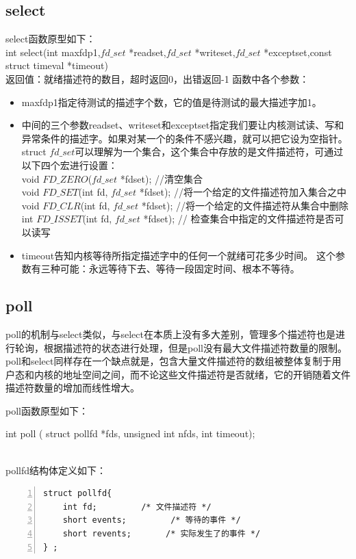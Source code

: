 \subsection{select}
select函数原型如下：\\
int select(int maxfdp1,$fd\_set$ *readset,$fd\_set$ *writeset,$fd\_set$ *exceptset,const struct timeval *timeout) \\
返回值：就绪描述符的数目，超时返回0，出错返回-1
函数中各个参数：
\begin{itemize}
\item maxfdp1指定待测试的描述字个数，它的值是待测试的最大描述字加1。
\item 中间的三个参数readset、writeset和exceptset指定我们要让内核测试读、写和异常条件的描述字。如果对某一个的条件不感兴趣，就可以把它设为空指针。struct $fd\_set$可以理解为一个集合，这个集合中存放的是文件描述符，可通过以下四个宏进行设置：\\
void $FD\_ZERO$($fd\_set$ *fdset);           //清空集合               \\
void $FD\_SET$(int fd, $fd\_set$ *fdset);   //将一个给定的文件描述符加入集合之中 \\
void $FD\_CLR$(int fd, $fd\_set$ *fdset);   //将一个给定的文件描述符从集合中删除 \\
int $FD\_ISSET$(int fd, $fd\_set$ *fdset);   // 检查集合中指定的文件描述符是否可以读写 \\
\item timeout告知内核等待所指定描述字中的任何一个就绪可花多少时间。
这个参数有三种可能：永远等待下去、等待一段固定时间、根本不等待。
\end{itemize}
\subsection{poll}
poll的机制与select类似，与select在本质上没有多大差别，管理多个描述符也是进行轮询，根据描述符的状态进行处理，但是poll没有最大文件描述符数量的限制。poll和select同样存在一个缺点就是，包含大量文件描述符的数组被整体复制于用户态和内核的地址空间之间，而不论这些文件描述符是否就绪，它的开销随着文件描述符数量的增加而线性增大。

poll函数原型如下：\\
\centerline{int poll ( struct pollfd *fds, unsigned int nfds, int timeout);}\\
pollfd结构体定义如下：
\begin{lstlisting}[language={[ANSI]C},numbers=left,numberstyle=\tiny,%frame=shadowbox,
   rulesepcolor=\color{red!20!green!20!blue!20},
   keywordstyle=\color{blue!70!black},
   commentstyle=\color{blue!90!},
   basicstyle=\ttfamily]
struct pollfd{ 
    int fd;         /* 文件描述符 */ 
    short events;         /* 等待的事件 */ 
    short revents;       /* 实际发生了的事件 */ 
} ; 
\end{lstlisting}

